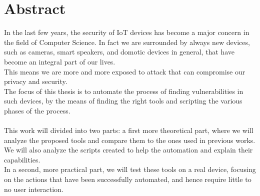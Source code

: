 \chapter*{Abstract} %
\label{abtract}


In the last few years, the security of IoT devices has become a major concern
in the field of Computer Science. In fact we are surrounded by always
new devices, such as cameras, smart speakers, and domotic devices in general,
that have become an integral part of our lives. \\
This means we are more and more exposed to attack that can compromise our
privacy and security. \\
The focus of this thesis is to automate the process of finding vulnerabilities
in such devices, by the means of finding the right tools and scripting the
various phases of the process. \\\\
This work will divided into two parts: a first more theoretical part, where
we will analyze the proposed tools and compare them to the ones used in previous works.
We will also analyze the scripts created to help the automation and explain their capabilities. \\
In a second, more practical part, we will test these tools on a real device,
focusing on the actions that have been successfully automated, and hence require
little to no user interaction. \\
\newpage